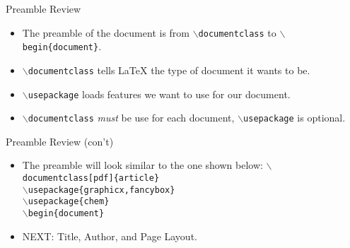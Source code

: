 \documentclass[pdf]{prosper}
\begin{document}
\begin{slide}{Preamble Review}
	\begin{itemize}
 		\item The preamble of the document is from \texttt{$\backslash$documentclass} to \texttt{$\backslash$begin\{document\}}.
	 	\item \texttt{$\backslash$documentclass} tells \LaTeX\mbox{} the type of document it wants to be.
 		\item \texttt{$\backslash$usepackage} loads features we want to use for our document.
 		\item \texttt{$\backslash$documentclass} \emph{must} be use for each document, \texttt{$\backslash$usepackage} is optional.
 	\end{itemize}
\end{slide}
\begin{slide}{Preamble Review (con't)}
 	\begin{itemize}
 		\item The preamble will look similar to the one shown below:
		 		\texttt{$\backslash$documentclass[pdf]\{article\}} \\
			 	\texttt{$\backslash$usepackage\{graphicx,fancybox\}} \\
				\texttt{$\backslash$usepackage\{chem\}} \\
				\texttt{$\backslash$begin\{document\}} \\
		\item NEXT: Title, Author, and Page Layout.
	\end{itemize}
\end{slide}
\end{document}
